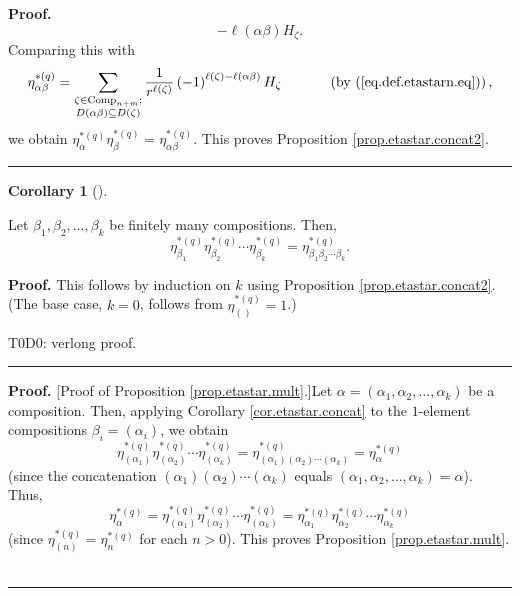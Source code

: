\documentclass[numbers=enddot,12pt,final,onecolumn,notitlepage]{scrartcl}%
\theoremstyle{definition}
\newtheorem{coro}[theo]{Corollary}
\newenvironment{corollary}[1][]
{\begin{coro}[#1]\begin{leftbar}}
{\end{leftbar}\end{coro}}
\newenvironment{proof}[1][Proof]{\noindent\textbf{#1.} }{\ \rule{0.5em}{0.5em}}
\let\sumnonlimits\sum
\renewcommand{\sum}{\sumnonlimits\limits}
\newenvironment{verlong}{}{}
\newenvironment{noncompile}{}{}
\begin{document}
\begin{proof}
\begin{noncompile}
\[{-\ell\left(  \alpha\beta\right)  }H_{\zeta}.
\]
Comparing this with%
\[
\eta_{\alpha\beta}^{\ast\left(  q\right)  }=\sum_{\substack{\zeta
\in\operatorname*{Comp}\nolimits_{n+m};\\D\left(  \alpha\beta\right)
\subseteq D\left(  \zeta\right)  }}\dfrac{1}{r^{\ell\left(  \zeta\right)  }%
}\left(  -1\right)  ^{\ell\left(  \zeta\right)  -\ell\left(  \alpha
\beta\right)  }H_{\zeta}\ \ \ \ \ \ \ \ \ \ \left(  \text{by
(\ref{eq.def.etastarn.eq})}\right)  ,
\]
we obtain $\eta_{\alpha}^{\ast\left(  q\right)  }\eta_{\beta}^{\ast\left(
q\right)  }=\eta_{\alpha\beta}^{\ast\left(  q\right)  }$. This proves
Proposition \ref{prop.etastar.concat2}.
\end{noncompile}
\end{proof}

\begin{corollary}
\label{cor.etastar.concat}Let $\beta_{1},\beta_{2},\ldots,\beta_{k}$ be
finitely many compositions. Then,%
\[
\eta_{\beta_{1}}^{\ast\left(  q\right)  }\eta_{\beta_{2}}^{\ast\left(
q\right)  }\cdots\eta_{\beta_{k}}^{\ast\left(  q\right)  }=\eta_{\beta
_{1}\beta_{2}\cdots\beta_{k}}^{\ast\left(  q\right)  }.
\]

\end{corollary}

\begin{proof}
This follows by induction on $k$ using Proposition \ref{prop.etastar.concat2}.
(The base case, $k=0$, follows from $\eta_{\left(  {}\right)  }^{\ast\left(
q\right)  }=1$.) \qedhere


\begin{verlong}
T0D0: verlong proof.
\end{verlong}
\end{proof}

\begin{proof}
[Proof of Proposition \ref{prop.etastar.mult}.]Let $\alpha=\left(  \alpha
_{1},\alpha_{2},\ldots,\alpha_{k}\right)  $ be a composition. Then, applying
Corollary \ref{cor.etastar.concat} to the $1$-element compositions $\beta
_{i}=\left(  \alpha_{i}\right)  $, we obtain%
\[
\eta_{\left(  \alpha_{1}\right)  }^{\ast\left(  q\right)  }\eta_{\left(
\alpha_{2}\right)  }^{\ast\left(  q\right)  }\cdots\eta_{\left(  \alpha
_{k}\right)  }^{\ast\left(  q\right)  }=\eta_{\left(  \alpha_{1}\right)
\left(  \alpha_{2}\right)  \cdots\left(  \alpha_{k}\right)  }^{\ast\left(
q\right)  }=\eta_{\alpha}^{\ast\left(  q\right)  }%
\]
(since the concatenation $\left(  \alpha_{1}\right)  \left(  \alpha
_{2}\right)  \cdots\left(  \alpha_{k}\right)  $ equals $\left(  \alpha
_{1},\alpha_{2},\ldots,\alpha_{k}\right)  =\alpha$). Thus,%
\[
\eta_{\alpha}^{\ast\left(  q\right)  }=\eta_{\left(  \alpha_{1}\right)
}^{\ast\left(  q\right)  }\eta_{\left(  \alpha_{2}\right)  }^{\ast\left(
q\right)  }\cdots\eta_{\left(  \alpha_{k}\right)  }^{\ast\left(  q\right)
}=\eta_{\alpha_{1}}^{\ast\left(  q\right)  }\eta_{\alpha_{2}}^{\ast\left(
q\right)  }\cdots\eta_{\alpha_{k}}^{\ast\left(  q\right)  }%
\]
(since $\eta_{\left(  n\right)  }^{\ast\left(  q\right)  }=\eta_{n}%
^{\ast\left(  q\right)  }$ for each $n>0$). This proves Proposition
\ref{prop.etastar.mult}.
\end{proof}
\end{document}
